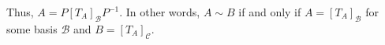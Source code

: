 \documentclass[10pt]{mypackage}
\begin{document}
Thus, $A = P \left[T_{A}\right]_{\mathcal{B}} P^{-1}$. In other words, $A\sim B$ if and only if $A = \left[T_{A}\right]_{\mathcal{B}}$ for some basis $\mathcal{B}$ and $B = \left[T_{A}\right]_{\mathcal{C}}$.
\end{document}
